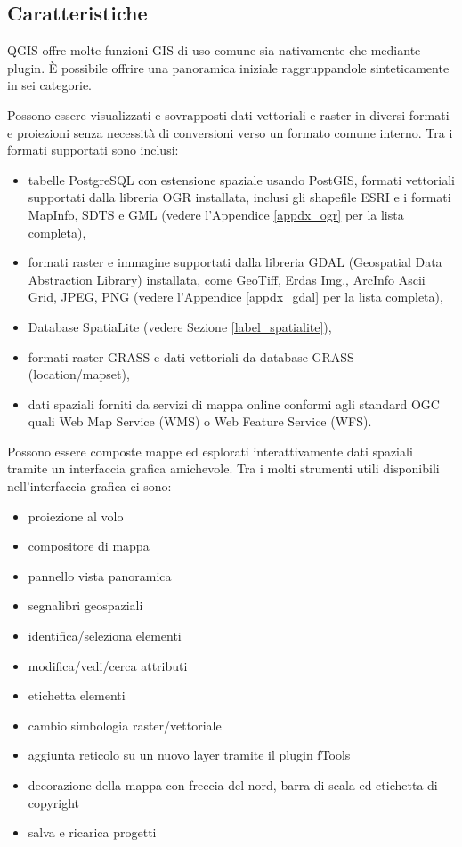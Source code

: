 \subsection{Caratteristiche}\label{label_majfeat}

QGIS offre molte funzioni GIS di uso comune sia nativamente che mediante plugin. È possibile offrire
una panoramica iniziale raggruppandole sinteticamente
in sei categorie.


Possono essere visualizzati e sovrapposti dati vettoriali e raster
in diversi formati e proiezioni senza necessità di conversioni verso un formato
comune interno. Tra i formati supportati sono inclusi:

\begin{itemize}
\item tabelle PostgreSQL con estensione spaziale usando PostGIS, formati vettoriali
supportati dalla libreria OGR installata, inclusi gli
shapefile ESRI e i formati MapInfo, SDTS e GML (vedere l'Appendice \ref{appdx_ogr} per la lista completa),
\item formati raster e immagine supportati dalla libreria GDAL (Geospatial
Data Abstraction Library) installata, come GeoTiff, Erdas Img., ArcInfo
Ascii Grid, JPEG, PNG (vedere l'Appendice \ref{appdx_gdal} per la lista completa),
\item Database SpatiaLite (vedere Sezione \ref{label_spatialite}),
\item formati raster GRASS e dati vettoriali da database GRASS (location/mapset), 
\item dati spaziali forniti da servizi di mappa online conformi agli standard
OGC quali Web Map Service (WMS) o Web Feature Service (WFS).
\end{itemize}


Possono essere composte mappe ed esplorati interattivamente dati spaziali
tramite un interfaccia grafica amichevole. Tra i molti strumenti utili disponibili
nell'interfaccia grafica ci sono:
\begin{itemize}
\item proiezione al volo
\item compositore di mappa
\item pannello vista panoramica 
\item segnalibri geospaziali 
\item identifica/seleziona elementi
\item modifica/vedi/cerca attributi
\item etichetta elementi
\item cambio simbologia raster/vettoriale
\item aggiunta reticolo su un nuovo layer tramite il plugin fTools
\item decorazione della mappa con freccia del nord, barra di scala ed etichetta di copyright
\item salva e ricarica progetti
\end{itemize}

